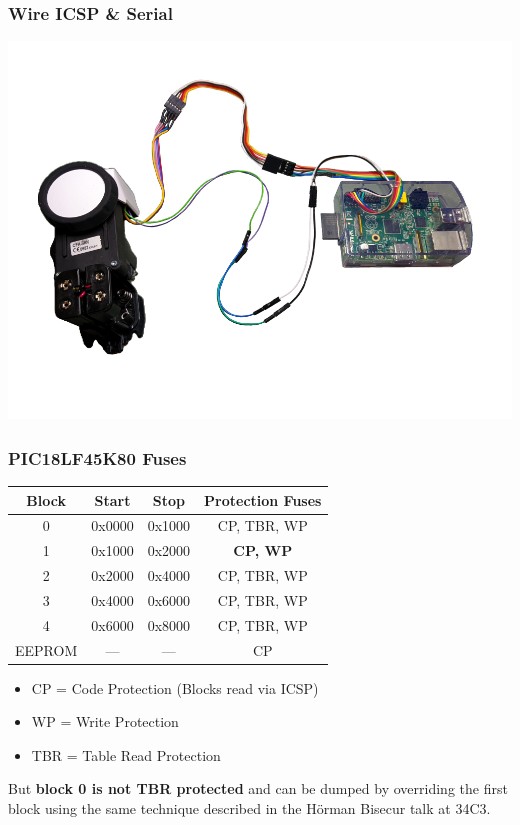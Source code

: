 \documentclass[aspectratio=169]{beamer}
\begin{document}
\begin{frame}
	\frametitle{Wire ICSP \& Serial}

	\begin{center}
		\includegraphics[height=1.0\textheight]{hardware-modification-02.png}
	\end{center}
\end{frame}

\begin{frame}
	\frametitle{PIC18LF45K80 Fuses}

	\begin{center}
		\begin{tabular}{|c|c|c|c|}
			\hline
			Block & Start & Stop & Protection Fuses \\
			\hline
			0 & 0x0000 & 0x1000 & CP, TBR, WP \\
			1 & 0x1000 & 0x2000 & \textbf{CP, WP} \\
			2 & 0x2000 & 0x4000 & CP, TBR, WP \\
			3 & 0x4000 & 0x6000 & CP, TBR, WP \\
			4 & 0x6000 & 0x8000 & CP, TBR, WP \\
			EEPROM & --- & --- & CP \\
			\hline
		\end{tabular}
	\end{center}

	\begin{itemize}
		\item CP = Code Protection (Blocks read via ICSP)
		\item WP = Write Protection
		\item TBR = Table Read Protection
	\end{itemize}

	\vspace{0.25cm}

	But \textbf{block 0 is not TBR protected} and can be dumped by overriding
	the first block using the same technique described in the Hörman Bisecur
	talk at 34C3.
\end{frame}
\end{document}
